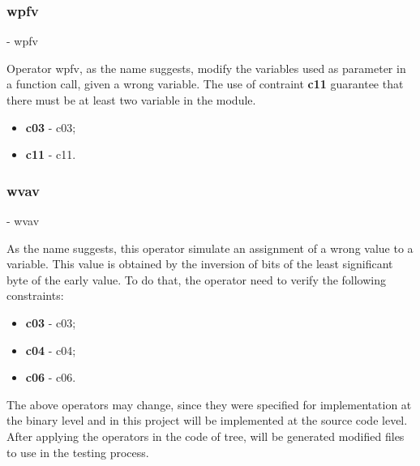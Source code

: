 	\subsubsection{\textbf{\acs{wpfv}}} - \Acl{wpfv}
	\hypertarget{wpfv}{}

	Operator \ac{wpfv}, as the name suggests, modify the variables used as parameter in a function call, given a wrong variable. The use of contraint \textbf{\acs{c11}} guarantee that there must be at least two variable in the module.

	\begin{itemize}
		\item \textbf{\acs{c03}} - \Acl{c03};
		\item \textbf{\acs{c11}} - \Acl{c11}.
	\end{itemize}

	\subsubsection{\textbf{\acs{wvav}}} - \Acl{wvav}
	\hypertarget{wvav}{}

	As the name suggests, this operator simulate an assignment of a wrong value to a variable. This value is obtained by the inversion of bits of the least significant byte of the early value. To do that, the operator need to verify the following constraints:

	\begin{itemize}
		\item \textbf{\acs{c03}} - \Acl{c03};
		\item \textbf{\acs{c04}} - \Acl{c04};
		\item \textbf{\acs{c06}} - \Acl{c06}.
	\end{itemize}

The above operators may change, since they were specified for implementation at the binary level and in this project will be implemented at the source code level.
After applying the operators in the code of tree, will be generated modified files to use in the testing process.

\clearpage

